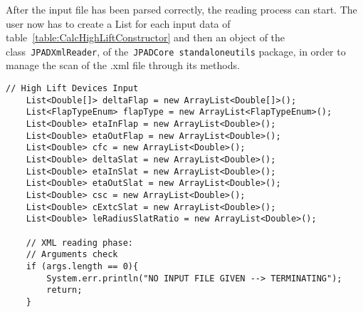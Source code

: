 After the input file has been parsed correctly, the reading process can start. The user now has to create a \gls{List} for each input data of table~\ref{table:CalcHighLiftConstructor} and then an object of the class~\lstinline[language=Java]!JPADXmlReader!, of the~\lstinline[language=Java]!JPADCore!~\lstinline[language=Java]!standaloneutils! package, in order to manage the scan of the .xml file through its methods. 

\bigskip
\begin{lstlisting}[caption={Excerpt of B747-100B test - Input data reading}, captionpos=b, tabsize=2]
	// High Lift Devices Input
	List<Double[]> deltaFlap = new ArrayList<Double[]>();
	List<FlapTypeEnum> flapType = new ArrayList<FlapTypeEnum>();
	List<Double> etaInFlap = new ArrayList<Double>();
	List<Double> etaOutFlap = new ArrayList<Double>();
	List<Double> cfc = new ArrayList<Double>();
	List<Double> deltaSlat = new ArrayList<Double>();
	List<Double> etaInSlat = new ArrayList<Double>();
	List<Double> etaOutSlat = new ArrayList<Double>();
	List<Double> csc = new ArrayList<Double>();
	List<Double> cExtcSlat = new ArrayList<Double>();
	List<Double> leRadiusSlatRatio = new ArrayList<Double>();
		
	// XML reading phase:
	// Arguments check
	if (args.length == 0){
		System.err.println("NO INPUT FILE GIVEN --> TERMINATING");
		return;
	}
		

\end{lstlisting}
